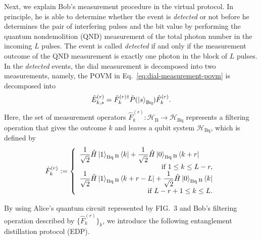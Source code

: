 \documentclass[twocolumn,superscriptaddress,pra,footinbib,notitlepage]{revtex4-1}
\newcommand{\1}{\mbox{1}\hspace{-0.25em}\mbox{l}}
\begin{document}
Next, we explain Bob's measurement procedure in the virtual protocol.
In principle, he is able to determine whether the event is \textit{detected} or not before he determines the pair of interfering pulses and the bit value by performing the quantum nondemolition (QND) measurement of the total photon number in the incoming $L$ pulses. The event is called \textit{detected} if and only if the measurement outcome of the QND measurement is exactly one photon in the block of $L$ pulses. In the \textit{detected} events, the dial measurement is decomposed into two measurements, namely, the POVM in Eq.~\eqref{eq:dial-measurement-povm} is decomposed into
\begin{align}
\hat{E}_{k, s}^{(r)}=\hat{F}_{k}^{(r)\dagger} \hat{P}(\ket{s}_\textrm{Bq})\hat{F}_{k}^{(r)}.
\label{eq:bob_decoposition}
\end{align}
Here, the set of measurement operators $\hat{F}_{k}^{(r)}: \mathcal{H}_\textrm{B}\to\mathcal{H}_\textrm{Bq}$ represents a filtering operation that gives the outcome $k$ and leaves a qubit system $\mathcal{H}_\textrm{Bq}$, which is defined by
\begin{align}
\hat{F}_{k}^{(r)}:=\left\{
\begin{array}{l}
\displaystyle\frac{1}{\sqrt{2}}\hat{H}\ket{1}_\textrm{Bq}{}_\textrm{B}\bra{k}+\frac{1}{\sqrt{2}}\hat{H}\ket{0}_\textrm{Bq}{}_\textrm{B}\bra{k+r}\\
\hfill\textrm{if }1\leq k\leq L-r,\\
\displaystyle\frac{1}{\sqrt{2}}\hat{H}\ket{1}_\textrm{Bq}{}_\textrm{B}\bra{k+r-L}+\frac{1}{\sqrt{2}}\hat{H}\ket{0}_\textrm{Bq}{}_\textrm{B}\bra{k}\\
\hfill\textrm{if }L-r+1\leq k\leq L.
\end{array}
\right.
\label{defi:filtering-operation}
\end{align}

By using Alice's quantum circuit represented by FIG.~3 and Bob's filtering operation described by $\{\hat{F}_k^{(r)}\}_k$, we introduce the following entanglement distillation protocol (EDP).
\end{document}

